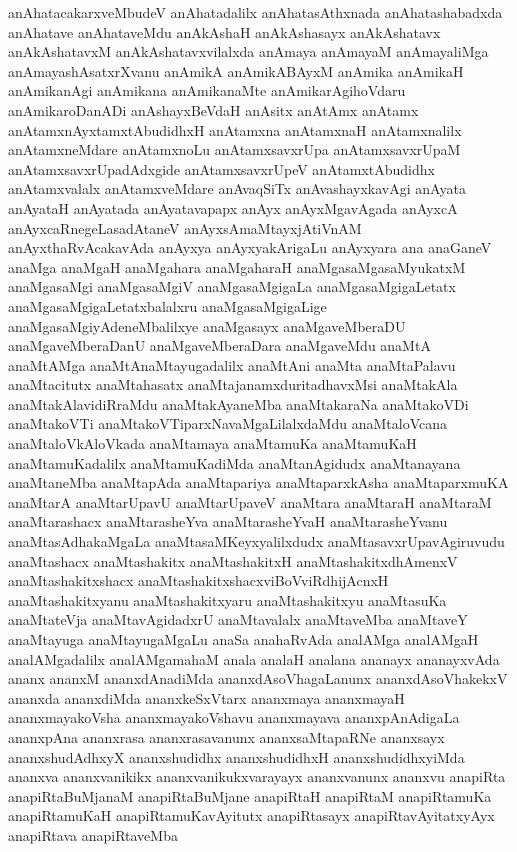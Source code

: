 {anAhatacakarxveMbudeV
anAhatadalilx
anAhatasAthxnada
anAhatashabadxda
anAhatave
anAhataveMdu
anAkAshaH
anAkAshasayx
anAkAshatavx
anAkAshatavxM
anAkAshatavxvilalxda
anAmaya
anAmayaM
anAmayaliMga
anAmayashAsatxrXvanu
anAmikA
anAmikABAyxM
anAmika
anAmikaH
anAmikanAgi
anAmikana
anAmikanaMte
anAmikarAgihoVdaru
anAmikaroDanADi
anAshayxBeVdaH
anAsitx
anAtAmx
anAtamx
anAtamxnAyxtamxtAbudidhxH
anAtamxna
anAtamxnaH
anAtamxnalilx
anAtamxneMdare
anAtamxnoLu
anAtamxsavxrUpa
anAtamxsavxrUpaM
anAtamxsavxrUpadAdxgide
anAtamxsavxrUpeV
anAtamxtAbudidhx
anAtamxvalalx
anAtamxveMdare
anAvaqSiTx
anAvashayxkavAgi
anAyata
anAyataH
anAyatada
anAyatavapapx
anAyx
anAyxMgavAgada
anAyxcA
anAyxcaRnegeLasadAtaneV
anAyxsAmaMtayxjAtiVnAM
anAyxthaRvAcakavAda
anAyxya
anAyxyakArigaLu
anAyxyara
ana
anaGaneV
anaMga
anaMgaH
anaMgahara
anaMgaharaH
anaMgasaMgasaMyukatxM
anaMgasaMgi
anaMgasaMgiV
anaMgasaMgigaLa
anaMgasaMgigaLetatx
anaMgasaMgigaLetatxbalalxru
anaMgasaMgigaLige
anaMgasaMgiyAdeneMbalilxye
anaMgasayx
anaMgaveMberaDU
anaMgaveMberaDanU
anaMgaveMberaDara
anaMgaveMdu
anaMtA
anaMtAMga
anaMtAnaMtayugadalilx
anaMtAni
anaMta
anaMtaPalavu
anaMtacitutx
anaMtahasatx
anaMtajanamxduritadhavxMsi
anaMtakAla
anaMtakAlavidiRraMdu
anaMtakAyaneMba
anaMtakaraNa
anaMtakoVDi
anaMtakoVTi
anaMtakoVTiparxNavaMgaLilalxdaMdu
anaMtaloVcana
anaMtaloVkAloVkada
anaMtamaya
anaMtamuKa
anaMtamuKaH
anaMtamuKadalilx
anaMtamuKadiMda
anaMtanAgidudx
anaMtanayana
anaMtaneMba
anaMtapAda
anaMtapariya
anaMtaparxkAsha
anaMtaparxmuKA
anaMtarA
anaMtarUpavU
anaMtarUpaveV
anaMtara
anaMtaraH
anaMtaraM
anaMtarashacx
anaMtarasheYva
anaMtarasheYvaH
anaMtarasheYvanu
anaMtasAdhakaMgaLa
anaMtasaMKeyxyalilxdudx
anaMtasavxrUpavAgiruvudu
anaMtashacx
anaMtashakitx
anaMtashakitxH
anaMtashakitxdhAmenxV
anaMtashakitxshacx
anaMtashakitxshacxviBoVviRdhijAcnxH
anaMtashakitxyanu
anaMtashakitxyaru
anaMtashakitxyu
anaMtasuKa
anaMtateVja
anaMtavAgidadxrU
anaMtavalalx
anaMtaveMba
anaMtaveY
anaMtayuga
anaMtayugaMgaLu
anaSa
anahaRvAda
analAMga
analAMgaH
analAMgadalilx
analAMgamahaM
anala
analaH
analana
ananayx
ananayxvAda
ananx
ananxM
ananxdAnadiMda
ananxdAsoVhagaLanunx
ananxdAsoVhakekxV
ananxda
ananxdiMda
ananxkeSxVtarx
ananxmaya
ananxmayaH
ananxmayakoVsha
ananxmayakoVshavu
ananxmayava
ananxpAnAdigaLa
ananxpAna
ananxrasa
ananxrasavanunx
ananxsaMtapaRNe
ananxsayx
ananxshudAdhxyX
ananxshudidhx
ananxshudidhxH
ananxshudidhxyiMda
ananxva
ananxvanikikx
ananxvanikukxvarayayx
ananxvanunx
ananxvu
anapiRta
anapiRtaBuMjanaM
anapiRtaBuMjane
anapiRtaH
anapiRtaM
anapiRtamuKa
anapiRtamuKaH
anapiRtamuKavAyitutx
anapiRtasayx
anapiRtavAyitatxyAyx
anapiRtava
anapiRtaveMba
}

